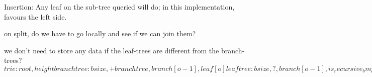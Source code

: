 \documentclass[12pt]{article}
\begin{document}
Insertion: Any leaf on the sub-tree queried will do; in this implementation, favours the left side.

on split, do we have to go locally and see if we can join them?

we don't need to store any data if the leaf-trees are different from the branch-trees?
$
trie: root, height
branch tree: bsize, +branchtree, branch[o-1], leaf[o]
leaf tree: bsize, ?, branch[o-1], is_recursive_bmp[o/8], leaf[o]
or
leaf tree: bsize, ?, branch[o-1], leaf[o] { skip, union{ data, trie } }
or
leaf tree: bsize, ?, branch[o-1], leaf[o] { 32:skip, 32:height, 64:root / 64:data }
$


\end{document}
